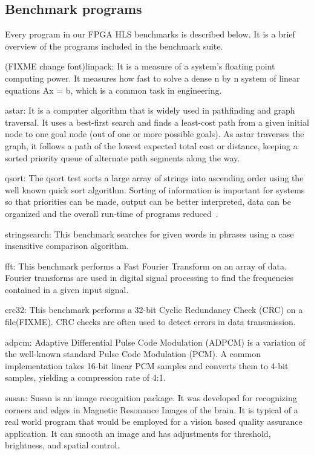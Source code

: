 \documentclass[conference]{IEEEtran}
\begin{document}
\subsection{Benchmark programs}
Every program in our FPGA HLS benchmarks is described below. It is a brief overview of the programs included in the benchmark suite.

(FIXME change font)linpack: It is a measure of a system's floating point computing power. It measures how fast to solve a dense n by n system of linear equations Ax = b, which is a common task in engineering.

astar: It is a computer algorithm that is widely used in pathfinding and graph traversal. It uses a best-first search and finds a least-cost path from a given initial node to one goal node (out of one or more possible goals). As astar traverses the graph, it follows a path of the lowest expected total cost or distance, keeping a sorted priority queue of alternate path segments along the way.

qsort:  The qsort test sorts a large array of strings into ascending order using the well known quick sort algorithm. Sorting of information is important for systems so that priorities can be made, output can be better interpreted, data can be organized and the overall run-time of programs reduced~\cite{guthaus2001mibench}.

stringsearch: This benchmark searches for given words in phrases using a case insensitive comparison algorithm.

fft:  This benchmark performs a Fast Fourier Transform on an array of data. Fourier transforms are used in digital signal processing to find the frequencies contained in a given input signal.

crc32:  This benchmark performs a 32-bit Cyclic Redundancy Check (CRC) on a file(FIXME). CRC checks are often used to detect errors in data transmission.

adpcm:  Adaptive Differential Pulse Code Modulation (ADPCM) is a variation of the well-known standard Pulse Code Modulation (PCM). A common implementation takes 16-bit linear PCM samples and converts them to 4-bit samples, yielding a compression rate of 4:1.

susan:  Susan is an image recognition package. It was developed for recognizing corners and edges in Magnetic Resonance Images of the brain. It is typical of a real world program that would be employed for a vision based quality assurance application. It can smooth an image and has adjustments for threshold, brightness, and spatial control.
\end{document}
